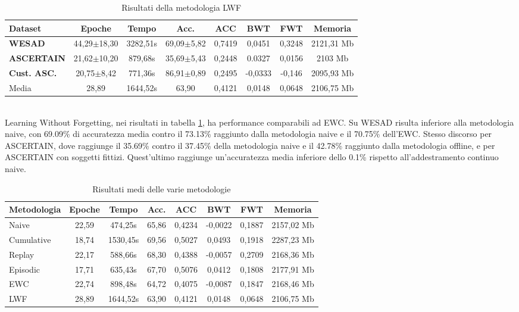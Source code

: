 \begin{table}[h]
\footnotesize
    \begin{tabular}{l|c|c|c|c|c|c|c}
        \textbf{Dataset} & \textbf{Epoche} & \textbf{Tempo} & \textbf{Acc.} & \textbf{ACC} & \textbf{BWT} & \textbf{FWT} & \textbf{Memoria}\\
        \hline
        \textbf{WESAD} & 44,29$\pm$18,30 & 3282,51s & 69,09$\pm$5,82 & 0,7419 & 0,0451 & 0,3248 & 2121,31 Mb\\
        \textbf{ASCERTAIN} & 21,62$\pm$10,20 & 879,68s & 35,69$\pm$5,43 & 0,2448 & 0.0327 & 0,0156 & 2103 Mb\\
        \textbf{Cust. ASC.} & 20,75$\pm$8,42 & 771,36s & 86,91$\pm$0,89 & 0,2495 & -0,0333 & -0,146 & 2095,93 Mb\\
        \hline
        Media & 28,89 & 1644,52s & 63,90 & 0,4121 & 0,0148 & 0,0648 & 2106,75 Mb
    \end{tabular}
    \caption{Risultati della metodologia LWF}
    \label{tab:reslwf}
\end{table}\\
Learning Without Forgetting, nei risultati in tabella \ref{tab:reslwf}, ha performance comparabili ad EWC. Su WESAD risulta inferiore alla metodologia naive, con 69.09\% di accuratezza media contro il 73.13\% raggiunto dalla metodologia naive e il 70.75\% dell'EWC. Stesso discorso per ASCERTAIN, dove raggiunge il 35.69\% contro il 37.45\% della metodologia naive e il 42.78\% raggiunto dalla metodologia offline, e per ASCERTAIN con soggetti fittizi. Quest'ultimo raggiunge un'accuratezza media inferiore dello 0.1\% rispetto all'addestramento continuo naive.
\begin{table}[h]
\footnotesize
    \begin{center}
        \begin{tabular}{l|c|c|c|c|c|c|c}
            \textbf{Metodologia} & \textbf{Epoche} & \textbf{Tempo} & \textbf{Acc.} & \textbf{ACC} & \textbf{BWT} & \textbf{FWT} & \textbf{Memoria}\\
            \hline
            Naive & 22,59 & 474,25s & 65,86 & 0,4234 & -0,0022 & 0,1887 & 2157,02 Mb\\
            Cumulative & 18,74 & 1530,45s & 69,56 & 0,5027 & 0,0493 & 0,1918 & 2287,23 Mb\\
            Replay & 22,17 & 588,66s & 68,30 & 0,4388 & -0,0057 & 0,2709 & 2168,36 Mb\\
            Episodic & 17,71 & 635,43s & 67,70 & 0,5076 & 0,0412 & 0,1808 & 2177,91 Mb\\
            EWC & 22,74 & 898,48s & 64,72 & 0,4075 & -0,0087 & 0,1847 & 2168,46 Mb\\
            LWF & 28,89 & 1644,52s & 63,90 & 0,4121 & 0,0148 & 0,0648 & 2106,75 Mb
        \end{tabular}
        \caption{Risultati medi delle varie metodologie}
        \label{tab:allres_mean}
    \end{center}
\end{table}